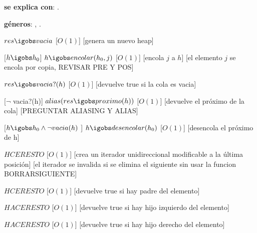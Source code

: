 \begin{Interfaz}

  \textbf{se explica con}: .

  \textbf{g\'eneros}: , .



  {$res \igobs vacia$}%
  [$O(1)$]
  [genera un nuevo heap]


  [$h \igobs h_{0}$]
  {$h \igobs encolar(h_{0}, j)$}
  [$O(1)$]
  [encola $j$ a $h$]
  [el elemento $j$ se encola por copia, REVISAR PRE Y POS]

  {$res \igobs vacia?(h)$}
  [$O(1)$]
  [devuelve true si la cola es vacia]


  [$\neg$ vacia?(h)]  
  {$alias(res \igobs proximo(h))$} 
  [$O(1)$]
  [devuelve el pr\'oximo de la cola]
  [PREGUNTAR ALIASING Y ALIAS]
  
  
  [$h \igobs h_{0} \land \neg vacia(h)$ ]  
  {$h \igobs desencolar(h_{0})$} 
  [$O(1)$]
  [desencola el pr\'oximo de h]


  
  {$HCER ESTO$}%
  [$O(1)$]
  [crea un iterador unidireccional modificable a la \'ultima posici\'on]
  [el iterador se invalida si se elimina el siguiente sin usar la funcion BORRARSIGUIENTE]
 
 
  {$HCER ESTO$}
  [$O(1)$]
  [devuelve true si hay padre del elemento]
  
  {$HACER ESTO$}
  [$O(1)$]
  [devuelve true si hay hijo izquierdo del elemento]
  
  {$HACER ESTO$}
  [$O(1)$]
  [devuelve true si hay hijo derecho del elemento]
  

\end{Interfaz}
